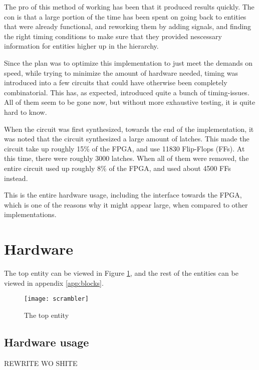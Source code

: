 The pro of this method of working has been that it produced results 
quickly. The con is that a large portion of the time has been 
spent on going back to entities that were already functional, and 
reworking them by adding signals, and finding the right timing 
conditions to make sure that they provided nescessary information for 
entities higher up in the hierarchy.

Since the plan was to optimize this implementation to just meet the 
demands on speed, while trying to minimize the amount of hardware 
needed, timing was introduced into a few circuits that could have 
otherwise been completely combinatorial. This has, as expected, 
introduced quite a bunch of timing-issues. All of them seem to be gone 
now, but without more exhaustive testing, it is quite hard to know.

When the circuit was first synthesized, towards the end of the 
implementation, it was noted that the circuit synthesized a large 
amount of latches. This made the circuit take up roughly 15\% of the 
FPGA, and use 11830 Flip-Flops (FFs). At this time, there were roughly 
3000 latches. When all of them were removed, the entire circuit 
used up roughly 8\% of the FPGA, and used about 4500 FFs instead.

This is the entire hardware usage, including the interface towards the 
FPGA, which is one of the reasons why it might appear large, when 
compared to other implementations.

\section{Hardware}
The top entity can be viewed in Figure \ref{b:scr}, and the rest of 
the entities can be viewed in appendix \ref{app:blocks}.

\begin{figure}
  \texttt{[image: scrambler]}
  \caption{The top entity}
  \label{b:scr}
\end{figure}

\subsection{Hardware usage}
REWRITE WO SHITE


